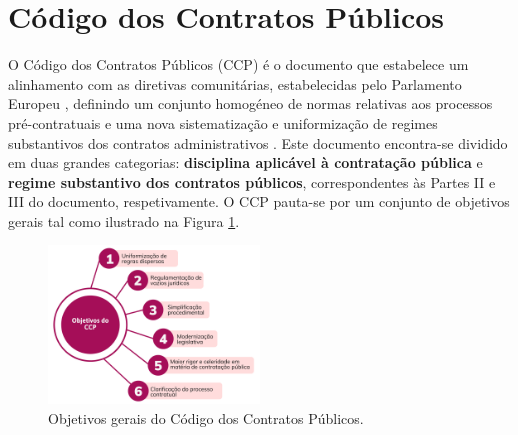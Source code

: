 



\section{Código dos Contratos Públicos}

O Código dos Contratos Públicos (CCP) é o documento que estabelece um alinhamento com as diretivas comunitárias,  estabelecidas pelo Parlamento Europeu \cite{ue_dire}, definindo um conjunto homogéneo de normas relativas aos processos pré-contratuais e uma nova sistematização e uniformização de regimes substantivos dos contratos administrativos \cite{guia_poise}. Este documento encontra-se dividido em duas grandes categorias: \textbf{disciplina aplicável à contratação pública} e \textbf{regime substantivo dos contratos públicos}, correspondentes às Partes II e III do documento, respetivamente. O CCP pauta-se por um conjunto de objetivos gerais tal como ilustrado na Figura \ref{fig:ccpgoals}.

\begin{figure}[H]
	\centering
	\includegraphics[width=0.5\textwidth]{imagens/ccp_objetivos.png}
	\caption{Objetivos gerais do Código dos Contratos Públicos.}
	\label{fig:ccpgoals}
\end{figure}



